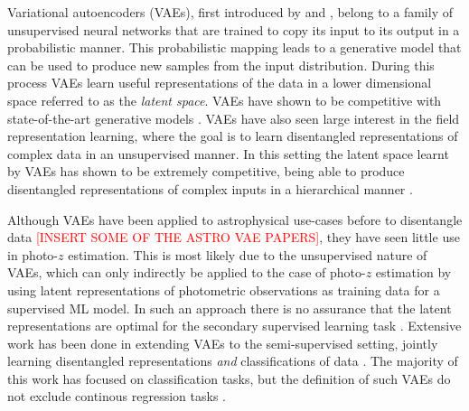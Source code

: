 Variational autoencoders (VAEs), first introduced by \citet{kingmaAutoEncodingVariationalBayes2022} and \cite{rezendeStochasticBackpropagationApproximate2014}, belong to a family of unsupervised neural networks that are trained to copy its input to its output in a probabilistic manner. This probabilistic mapping leads to a generative model that can be used to produce new samples from the input distribution. 
During this process VAEs learn useful representations of the data in a lower dimensional space referred to as the \textit{latent space}. VAEs have shown to be competitive with state-of-the-art generative models \citep{childVeryDeepVAEs2021, vahdatNVAEDeepHierarchical2021, maaloeBIVAVeryDeep2019}. VAEs have also seen large interest in the field representation learning, where the goal is to learn disentangled representations of complex data in an unsupervised manner.
In this setting the latent space learnt by VAEs has shown to be extremely competitive, being able to produce disentangled representations of complex inputs in a hierarchical manner \cite{siddharthLearningDisentangledRepresentations2017}. 

Although VAEs have been applied to astrophysical use-cases before to disentangle data \textcolor{red}{[INSERT SOME OF THE ASTRO VAE PAPERS]}, they have seen little use in photo-$z$ estimation. This is most likely due to the unsupervised nature of VAEs, which can only indirectly be applied to the case of photo-$z$ estimation by using latent representations of photometric observations as training data for a supervised ML model. In such an approach there is no assurance that the latent representations are optimal for the secondary supervised learning task \cite{kingmaSemiSupervisedLearningDeep2014}. Extensive work has been done in extending VAEs to the semi-supervised setting, jointly learning disentangled representations \textit{and} classifications of data \cite{kingmaSemiSupervisedLearningDeep2014, maaloeAuxiliaryDeepGenerative2016, maaloeBIVAVeryDeep2019}. The majority of this work has focused on classification tasks, but the definition of such VAEs do not exclude continous regression tasks \cite{maaloeAuxiliaryDeepGenerative2016}.

